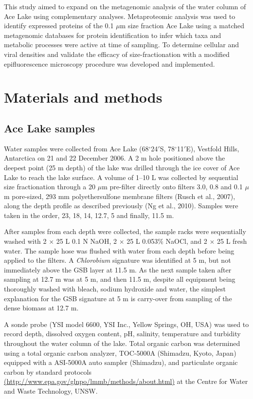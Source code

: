 This study aimed to expand on the metagenomic analysis of the water column of Ace Lake using complementary analyses.
Metaproteomic analysis was used to identify expressed proteins of the 0.1 $\mu$m size fraction Ace Lake using a matched metagenomic databases for protein identification to infer which taxa and metabolic processes were active at time of sampling.
To determine cellular and viral densities and validate the efficacy of size-fractionation with a modified epifluorescence microscopy procedure was developed and implemented.


\section{Materials and methods}
\label{ch:mm}
\subsection{Ace Lake samples}
Water samples were collected from Ace Lake (68$^{\circ}$24$'$S, 78$^{\circ}$11$'$E), Vestfold Hills, Antarctica on 21 and 22 December 2006. 
A 2 m hole positioned above the deepest point (25 m depth) of the lake was drilled through the ice cover of Ace Lake to reach the lake surface.
A volume of 1--10 L was collected by sequential size fractionation through a 20 $\mu$m pre-filter directly onto filters 3.0, 0.8 and 0.1 $\mu$m pore-sized, 293 mm polyethersulfone membrane filters (Rusch et al., 2007), along the depth profile as described previously (Ng et al., 2010).
Samples were taken in the order, 23, 18, 14, 12.7, 5 and finally, 11.5 m.

After samples from each depth were collected, the sample racks were sequentially washed with 2 $\times$ 25 L 0.1 N NaOH, 2 $\times$ 25 L 0.053\% NaOCl, and 2 $\times$ 25 L fresh water. 
The sample hose was flushed with water from each depth before being applied to the filters. 
A \emph{Chlorobium} signature was identified at 5 m, but not immediately above the \ac{GSB} layer at 11.5 m. 
As the next sample taken after sampling at 12.7 m was at 5 m, and then 11.5 m, despite all equipment being thoroughly washed with bleach, sodium hydroxide and water, 
the simplest explanation for the \ac{GSB} signature at 5 m is carry-over from sampling of the dense biomass at 12.7 m. 

A sonde probe (YSI model 6600, YSI Inc., Yellow Springs, OH, USA) was used to record depth, dissolved oxygen content, pH, salinity, temperature and turbidity throughout the water column of the lake. 
Total organic carbon was determined using a total organic carbon analyzer, TOC-5000A (Shimadzu, Kyoto, Japan) equipped with a ASI-5000A auto sampler (Shimadzu), and particulate organic carbon by standard protocols 
\url{(http://www.epa.gov/glnpo/lmmb/methods/about.html)} 
at the Centre for Water and Waste Technology, UNSW.


